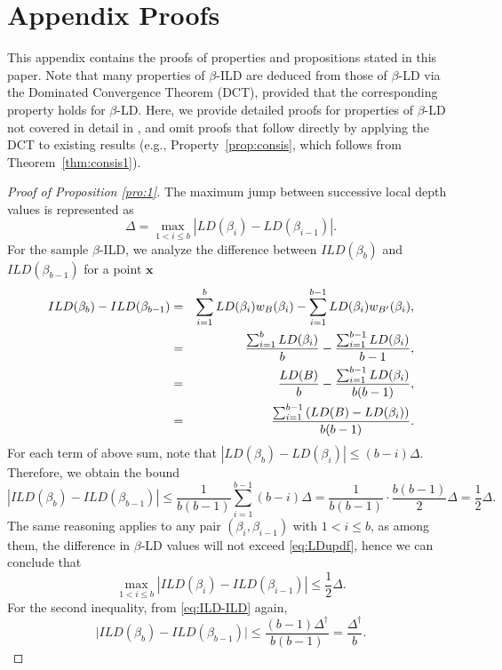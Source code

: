 \documentclass[final,3p,times]{elsarticle}
\newcommand{\vecx}{\mathbf{x}}
\begin{document}
\section*{Appendix Proofs}
\label{app1}
This appendix contains the proofs of properties and propositions stated in this paper. Note that many properties of $\beta$-ILD are deduced from those of $\beta$-LD via the Dominated Convergence Theorem (DCT), provided that the corresponding property holds for $\beta$-LD. Here, we provide detailed proofs for properties of $\beta$-LD not covered in detail in \cite{paindaveine2013depth}, and omit proofs that follow directly by applying the DCT to existing results (e.g., Property~\ref{prop:consis}, which follows from Theorem~\ref{thm:consis1}).
\begin{proof}[Proof of Proposition \ref{pro:1}]
The maximum jump between successive local depth values is represented as
\begin{equation}\label{eq:LDupdf}
\Delta = \max_{1 < i \le b} |LD(\beta_i) - LD(\beta_{i-1})|.
\end{equation}
For the sample $\beta$-ILD, we analyze the difference between $ILD(\beta_b)$ and $ILD(\beta_{b-1})$ for a point $\vecx$
\begin{eqnarray}\notag
    ILD(\beta_b) - ILD(\beta_{b-1}) &=& \sum_{i=1}^{b} LD(\beta_i) w_B(\beta_i) - \sum_{i=1}^{b-1} LD(\beta_i) w_{B'}(\beta_i), \\\notag
    &=& \frac{\sum_{i=1}^{b} LD(\beta_i)}{b} - \frac{\sum_{i=1}^{b-1} LD(\beta_i)}{b-1}, \\
    \notag
    &=& \frac{LD(B)}{b} - \frac{\sum_{i=1}^{b-1} LD(\beta_i)}{b(b-1)}, \\
    &=& \frac{\sum_{i=1}^{b-1} \left( LD(B) - LD(\beta_i) \right)}{b(b-1)}.
\label{eq:ILD-ILD}
\end{eqnarray}
For each term of above sum, note that 
$
|LD(\beta_b) - LD(\beta_i)| \le (b - i) \Delta.
$ Therefore, we obtain the bound
\[
|ILD(\beta_b) - ILD(\beta_{b-1})| \le \frac{1}{b(b-1)} \sum_{i=1}^{b-1} (b - i) \Delta
= \frac{1}{b(b-1)} \cdot \frac{b(b-1)}{2} \Delta
= \frac{1}{2} \Delta.
\]
The same reasoning applies to any pair $(\beta_i, \beta_{i-1})$ with $1 < i \le b$, as among them, the difference in $\beta$-LD values will not exceed \eqref{eq:LDupdf}, hence we can conclude that
\[
\max_{1 < i \le b} |ILD(\beta_i) - ILD(\beta_{i-1})| \le \frac{1}{2} \Delta.
\]
For the second inequality, from \eqref{eq:ILD-ILD} again,
$$
\bigl|ILD(\beta_b) - ILD(\beta_{b-1})\bigr|\le\frac{(b-1)\Delta^\dagger}{b(b-1)}=\frac{\Delta^\dagger}{b}.
$$
\end{proof}
\end{document}
